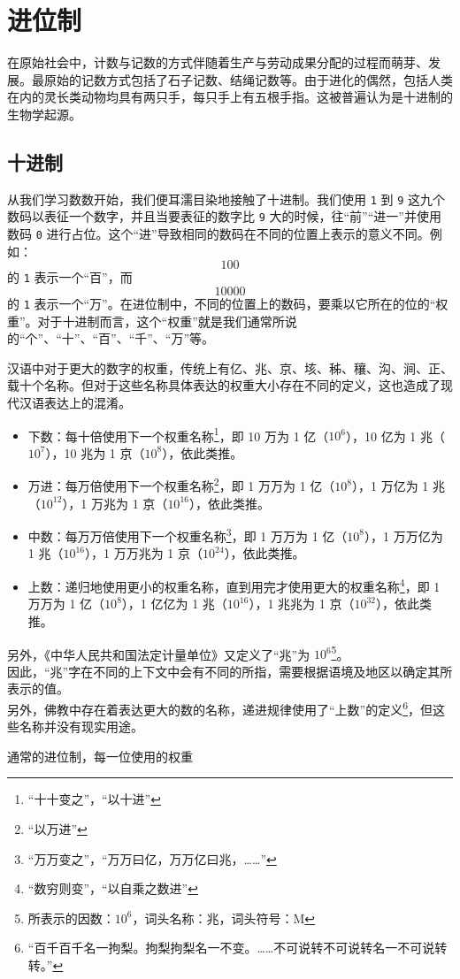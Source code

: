 \section{进位制}\label{sec:ArithBasics/positional-notation}
    在原始社会中，计数与记数的方式伴随着生产与劳动成果分配的过程而萌芽、发展。最原始的记数方式包括了石子记数、结绳记数等。由于进化的偶然，包括人类在内的灵长类动物均具有两只手，每只手上有五根手指。这被普遍认为是十进制的生物学起源。\\
    \subsection{十进制}\label{subsec:ArithBasics/positional-notation/decimal}
        从我们学习数数开始，我们便耳濡目染地接触了十进制。我们使用 \texttt{1} 到 \texttt{9} 这九个数码以表征一个数字，并且当要表征的数字比 \texttt{9} 大的时候，往“前”“进一”并使用数码 \texttt{0} 进行占位。这个“进”导致相同的数码在不同的位置上表示的意义不同。例如：\[100\]的 \texttt{1} 表示一个“百”，而\[10000\]的 \texttt{1} 表示一个“万”。在进位制中，不同的位置上的数码，要乘以它所在的位的“权重”。对于十进制而言，这个“权重”就是我们通常所说的“个”、“十”、“百”、“千”、“万”等。
        \begin{displayquote}
            汉语中对于更大的数字的权重，传统上有亿、兆、京、垓、秭、穰、沟、涧、正、载十个名称。但对于这些名称具体表达的权重大小存在不同的定义，这也造成了现代汉语表达上的混淆。\\
            \begin{itemize}
                \item 下数：每十倍使用下一个权重名称\footnote{“十十变之”\cite[卷上 12]{wujin}，“以十进”\cite[卷一 15]{shulijinyun}}，即 10 万为 1 亿（$10^6$），10 亿为 1 兆（$10^7$），10 兆为 1 京（$10^8$），依此类推。
                \item 万进：每万倍使用下一个权重名称\footnote{“以万进”\cite[卷一 15]{shulijinyun}}，即 1 万万为 1 亿（$10^8$），1 万亿为 1 兆（$10^{12}$），1 万兆为 1 京（$10^{16}$），依此类推。
                \item 中数：每万万倍使用下一个权重名称\footnote{“万万变之”\cite[卷上 12]{wujin}，“万万曰亿，万万亿曰兆，……”\cite[卷上 3]{sunzi}}，即 1 万万为 1 亿（$10^8$），1 万万亿为 1 兆（$10^{16}$），1 万万兆为 1 京（$10^{24}$），依此类推。
                \item 上数：递归地使用更小的权重名称，直到用完才使用更大的权重名称\footnote{“数穷则变”\cite[卷上 12]{wujin}，“以自乘之数进”\cite[卷上 15]{shulijinyun}}，即 1 万万为 1 亿（$10^8$），1 亿亿为 1 兆（$10^{16}$），1 兆兆为 1 京（$10^{32}$），依此类推。
            \end{itemize}
            另外，《中华人民共和国法定计量单位》又定义了“兆”为 $10^6$\footnote{所表示的因数：$10^6$，词头名称：兆，词头符号：M\cite[附件 表 5]{gf1984-28}}。\\
            因此，“兆”字在不同的上下文中会有不同的所指，需要根据语境及地区以确定其所表示的值。\\
            另外，佛教中存在着表达更大的数的名称，递进规律使用了“上数”的定义\footnote{“百千百千名一拘梨。拘梨拘梨名一不变。……不可说转不可说转名一不可说转转。”\cite[卷第二十九 1]{huayan}}，但这些名称并没有现实用途。
        \end{displayquote}
        通常的进位制，每一位使用的权重
